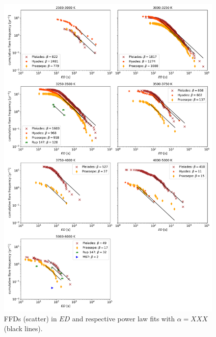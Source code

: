 \documentclass{aa}
\begin{document}
\begin{figure}
    \centering
    \includegraphics[width=16cm]{pics/FFDs/SpT_wise_sample_ffd_ED.png}
    \caption{FFDs (scatter) in $ED$ and respective power law fits with $\alpha=XXX$ (black lines).}          	\label{powerlawfits_s}
\end{figure}
\end{document}
